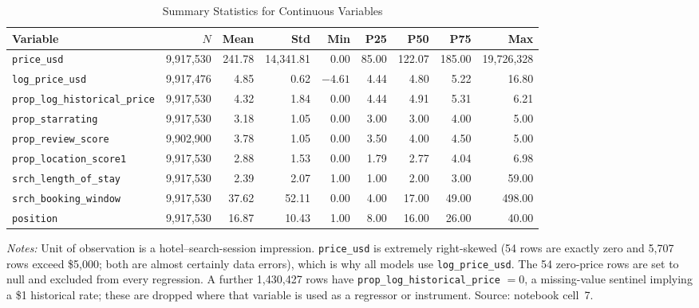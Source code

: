 \documentclass[11pt]{article}
\newcommand{\code}[1]{\texttt{\small #1}}
\begin{document}
\begin{table}[htbp]
  \centering
  \caption{Summary Statistics for Continuous Variables}
  \label{tab:summary}
  \small
  \begin{tabular}{lrrrrrrrr}
    \toprule
    Variable & $N$ & Mean & Std & Min & P25 & P50 & P75 & Max \\
    \midrule
    \code{price\_usd}                 & 9,917,530 & 241.78 & 14,341.81 & 0.00 & 85.00 & 122.07 & 185.00 & 19,726,328 \\
    \code{log\_price\_usd}            & 9,917,476 & 4.85 & 0.62 & $-4.61$ & 4.44 & 4.80 & 5.22 & 16.80 \\
    \code{prop\_log\_historical\_price} & 9,917,530 & 4.32 & 1.84 & 0.00 & 4.44 & 4.91 & 5.31 & 6.21 \\
    \code{prop\_starrating}           & 9,917,530 & 3.18 & 1.05 & 0.00 & 3.00 & 3.00 & 4.00 & 5.00 \\
    \code{prop\_review\_score}        & 9,902,900 & 3.78 & 1.05 & 0.00 & 3.50 & 4.00 & 4.50 & 5.00 \\
    \code{prop\_location\_score1}     & 9,917,530 & 2.88 & 1.53 & 0.00 & 1.79 & 2.77 & 4.04 & 6.98 \\
    \code{srch\_length\_of\_stay}     & 9,917,530 & 2.39 & 2.07 & 1.00 & 1.00 & 2.00 & 3.00 & 59.00 \\
    \code{srch\_booking\_window}      & 9,917,530 & 37.62 & 52.11 & 0.00 & 4.00 & 17.00 & 49.00 & 498.00 \\
    \code{position}                   & 9,917,530 & 16.87 & 10.43 & 1.00 & 8.00 & 16.00 & 26.00 & 40.00 \\
    \bottomrule
  \end{tabular}
  \vspace{0.6ex}
  \begin{minipage}{0.95\textwidth}
  \footnotesize \textit{Notes:} Unit of observation is a hotel--search-session
  impression. \code{price\_usd} is extremely right-skewed (54 rows are exactly
  zero and 5,707 rows exceed \$5,000; both are almost certainly data errors),
  which is why all models use \code{log\_price\_usd}. The 54 zero-price rows
  are set to null and excluded from every regression. A further 1,430,427 rows
  have \code{prop\_log\_historical\_price} $= 0$, a missing-value sentinel
  implying a \$1 historical rate; these are dropped where that variable is used
  as a regressor or instrument. Source: notebook cell~7.
  \end{minipage}
\end{table}
\end{document}
